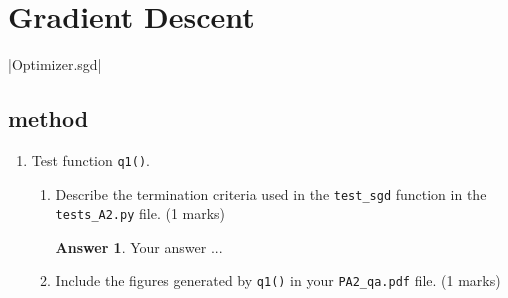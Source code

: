 \documentclass{article}
\theoremstyle{definition}
\newtheorem*{answer}{Answer}
\begin{document}
\section{Gradient Descent}
|Optimizer.sgd|
\subsection{ method}\label{partsgd}
\begin{enumerate}[label=\ref{partsgd}.\alph*]
	\item Test function \verb|q1()|.
	\begin{enumerate}[label=1.1.a.\roman*]
		\item Describe the termination criteria used in the \verb|test_sgd| function in the \verb|tests_A2.py| file. (1 marks)
		\begin{answer}
			Your answer ...
		\end{answer}
		\item Include the figures generated by \verb|q1()| in your \verb|PA2_qa.pdf| file. (1 marks)


\end{enumerate}
\end{enumerate}
\end{document}
